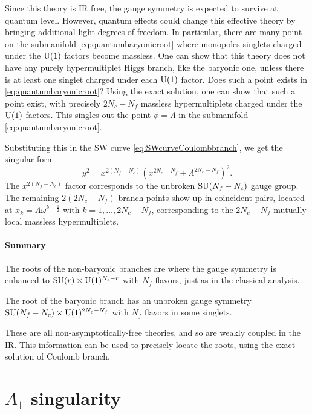         Since this theory is IR free, the gauge symmetry is expected to survive at quantum level. However, quantum effects could change this effective theory by bringing additional light degrees of freedom. In particular, there are many point on the submanifold \eqref{eq:quantumbaryonicroot} where monopoles singlets charged under the $\text{U}(1)$ factors become massless. One can show that this theory does not have any purely hypermultiplet Higgs branch, like the baryonic one, unless there is at least one singlet charged under each $\text{U}(1)$ factor. Does such a point exists in \eqref{eq:quantumbaryonicroot}? Using the exact solution, one can show that such a point exist, with precisely $2N_c-N_f$ massless hypermultiplets charged under the $\text{U}(1)$ factors. This singles out the point $\phi=\Lambda$ in the submanifold \eqref{eq:quantumbaryonicroot}.

        Substituting this in the SW curve \eqref{eq:SWcurveCoulombbranch}, we get the singular form
        \begin{equation}
            y^2=x^{2(N_f-N_c)}(x^{2N_c-N_f}+\Lambda^{2N_c-N_f})^2.
        \end{equation}
        The $x^{2(N_f-N_c)}$ factor corresponds to the unbroken $\text{SU}(N_f-N_c)$ gauge group. The remaining $2(2N_c-N_f)$ branch points show up in coincident pairs, located at $x_k=\Lambda\omega^{k-\frac{1}{2}}$ with $k=1,\dots,2N_c-N_f$, corresponding to the $2N_c-N_f$ mutually local massless hypermultiplets.

    \subsection{Summary}

        The roots of the non-baryonic branches are where the gauge symmetry is enhanced to $\text{SU}(r)\times\text{U}(1)^{N_c-r}$ with $N_f$ flavors, just as in the classical analysis.

        The root of the baryonic branch has an unbroken gauge symmetry $\text{SU}(N_f-N_c)\times\text{U}(1)^{2N_c-N_f}$ with $N_f$ flavors in some singlets.

        These are all non-asymptotically-free theories, and so are weakly coupled in the IR. This information can be used to precisely locate the roots, using the exact solution of Coulomb branch.


\part{$A_1$ singularity}


